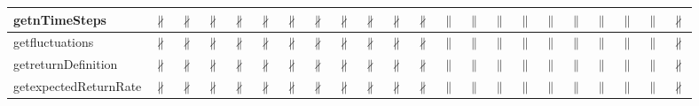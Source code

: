 \documentclass[10pt]{article}
\begin{document}
\begin{longtable}{|l|l|l|l|l|l|l|l|l|l|l|l|l|l|l|l|l|l|l|l|l|l|}
\hline
getnTimeSteps&{\color{BrickRed}$\nparallel$}&{\color{BrickRed}$\nparallel$}&{\color{BrickRed}$\nparallel$}&{\color{BrickRed}$\nparallel$}&{\color{BrickRed}$\nparallel$}&{\color{BrickRed}$\nparallel$}&{\color{BrickRed}$\nparallel$}&{\color{BrickRed}$\nparallel$}&{\color{BrickRed}$\nparallel$}&{\color{BrickRed}$\nparallel$}&{\color{BrickRed}$\nparallel$}&{\color{blue}$\parallel$}&{\color{blue}$\parallel$}&{\color{blue}$\parallel$}&{\color{blue}$\parallel$}&{\color{blue}$\parallel$}&{\color{blue}$\parallel$}&{\color{blue}$\parallel$}&{\color{blue}$\parallel$}&{\color{blue}$\parallel$}&{\color{BrickRed}$\nparallel$}\\
\hline
getfluctuations&{\color{BrickRed}$\nparallel$}&{\color{BrickRed}$\nparallel$}&{\color{BrickRed}$\nparallel$}&{\color{BrickRed}$\nparallel$}&{\color{BrickRed}$\nparallel$}&{\color{BrickRed}$\nparallel$}&{\color{BrickRed}$\nparallel$}&{\color{BrickRed}$\nparallel$}&{\color{BrickRed}$\nparallel$}&{\color{BrickRed}$\nparallel$}&{\color{BrickRed}$\nparallel$}&{\color{blue}$\parallel$}&{\color{blue}$\parallel$}&{\color{blue}$\parallel$}&{\color{blue}$\parallel$}&{\color{blue}$\parallel$}&{\color{blue}$\parallel$}&{\color{blue}$\parallel$}&{\color{blue}$\parallel$}&{\color{blue}$\parallel$}&{\color{BrickRed}$\nparallel$}\\
\hline
getreturnDefinition&{\color{BrickRed}$\nparallel$}&{\color{BrickRed}$\nparallel$}&{\color{BrickRed}$\nparallel$}&{\color{BrickRed}$\nparallel$}&{\color{BrickRed}$\nparallel$}&{\color{BrickRed}$\nparallel$}&{\color{BrickRed}$\nparallel$}&{\color{BrickRed}$\nparallel$}&{\color{BrickRed}$\nparallel$}&{\color{BrickRed}$\nparallel$}&{\color{BrickRed}$\nparallel$}&{\color{blue}$\parallel$}&{\color{blue}$\parallel$}&{\color{blue}$\parallel$}&{\color{blue}$\parallel$}&{\color{blue}$\parallel$}&{\color{blue}$\parallel$}&{\color{blue}$\parallel$}&{\color{blue}$\parallel$}&{\color{blue}$\parallel$}&{\color{BrickRed}$\nparallel$}\\
\hline
getexpectedReturnRate&{\color{BrickRed}$\nparallel$}&{\color{BrickRed}$\nparallel$}&{\color{BrickRed}$\nparallel$}&{\color{BrickRed}$\nparallel$}&{\color{BrickRed}$\nparallel$}&{\color{BrickRed}$\nparallel$}&{\color{BrickRed}$\nparallel$}&{\color{BrickRed}$\nparallel$}&{\color{BrickRed}$\nparallel$}&{\color{BrickRed}$\nparallel$}&{\color{BrickRed}$\nparallel$}&{\color{blue}$\parallel$}&{\color{blue}$\parallel$}&{\color{blue}$\parallel$}&{\color{blue}$\parallel$}&{\color{blue}$\parallel$}&{\color{blue}$\parallel$}&{\color{blue}$\parallel$}&{\color{blue}$\parallel$}&{\color{blue}$\parallel$}&{\color{BrickRed}$\nparallel$}\\

\end{longtable}
\end{document}
